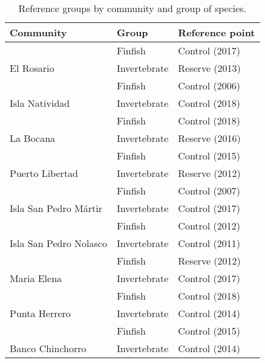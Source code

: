 \begin{table}[H]

\caption{\label{tab:ref_dict}Reference groups by community and group of species.}
\centering
\begin{tabular}[t]{lll}
\toprule
Community & Group & Reference point\\
\midrule
 & Finfish & Control (2017)\\
\cmidrule{2-3}
\multirow{-2}{*}{\raggedright\arraybackslash El Rosario} & Invertebrate & Reserve (2013)\\
\cmidrule{1-3}
 & Finfish & Control (2006)\\
\cmidrule{2-3}
\multirow{-2}{*}{\raggedright\arraybackslash Isla Natividad} & Invertebrate & Control (2018)\\
\cmidrule{1-3}
 & Finfish & Control (2018)\\
\cmidrule{2-3}
\multirow{-2}{*}{\raggedright\arraybackslash La Bocana} & Invertebrate & Reserve (2016)\\
\cmidrule{1-3}
 & Finfish & Control (2015)\\
\cmidrule{2-3}
\multirow{-2}{*}{\raggedright\arraybackslash Puerto Libertad} & Invertebrate & Reserve (2012)\\
\cmidrule{1-3}
 & Finfish & Control (2007)\\
\cmidrule{2-3}
\multirow{-2}{*}{\raggedright\arraybackslash Isla San Pedro Mártir} & Invertebrate & Control (2017)\\
\cmidrule{1-3}
 & Finfish & Control (2012)\\
\cmidrule{2-3}
\multirow{-2}{*}{\raggedright\arraybackslash Isla San Pedro Nolasco} & Invertebrate & Control (2011)\\
\cmidrule{1-3}
 & Finfish & Reserve (2012)\\
\cmidrule{2-3}
\multirow{-2}{*}{\raggedright\arraybackslash Maria Elena} & Invertebrate & Control (2017)\\
\cmidrule{1-3}
 & Finfish & Control (2018)\\
\cmidrule{2-3}
\multirow{-2}{*}{\raggedright\arraybackslash Punta Herrero} & Invertebrate & Control (2014)\\
\cmidrule{1-3}
 & Finfish & Control (2015)\\
\cmidrule{2-3}
\multirow{-2}{*}{\raggedright\arraybackslash Banco Chinchorro} & Invertebrate & Control (2014)\\
\bottomrule
\end{tabular}
\end{table}
